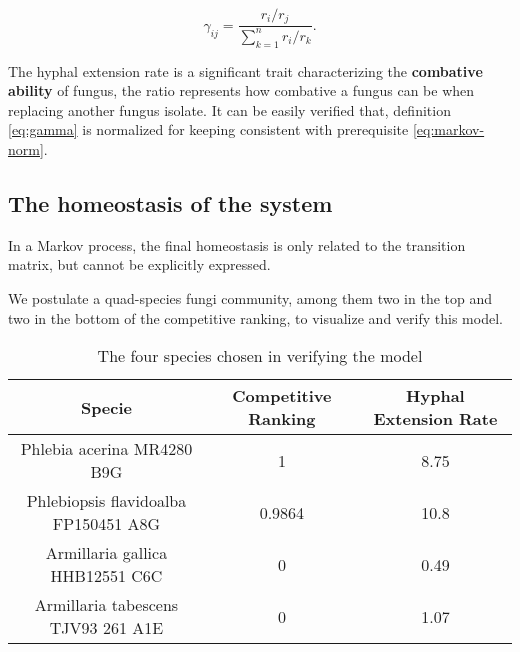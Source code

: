 \begin{equation}\label{eq:gamma}
    \gamma_{ij} = \frac{r_i/r_j}{\sum_{k=1}^n r_i/r_k}.
\end{equation}

The hyphal extension rate is a significant trait characterizing the \textbf{combative ability} of fungus, the ratio represents how combative a fungus can be when replacing another fungus isolate. It can be easily verified that, definition \eqref{eq:gamma} is normalized for keeping consistent with prerequisite \eqref{eq:markov-norm}.

\subsection{The homeostasis of the system}





In a Markov process, the final homeostasis is only related to the transition matrix, but cannot be explicitly expressed.

We postulate a quad-species fungi community, among them two in the top and two in the bottom of the competitive ranking, to visualize and verify this model.

\begin{table}\caption{The four species chosen in verifying the model}
    \centering
    \begin{tabular}{ccc}
        \toprule
        Specie & Competitive Ranking & Hyphal Extension Rate \\
        \midrule
        Phlebia acerina MR4280 B9G & 1 & 8.75 \\
        Phlebiopsis flavidoalba FP150451 A8G & 0.9864 & 10.8 \\
        Armillaria gallica HHB12551 C6C & 0 & 0.49 \\
        Armillaria tabescens TJV93 261 A1E & 0 & 1.07 \\
        \bottomrule
    \end{tabular}
\end{table}

